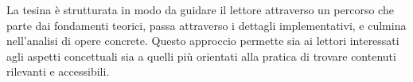 La tesina è strutturata in modo da guidare il lettore attraverso un percorso che parte dai fondamenti teorici, passa attraverso i dettagli implementativi, e culmina nell'analisi di opere concrete. Questo approccio permette sia ai lettori interessati agli aspetti concettuali sia a quelli più orientati alla pratica di trovare contenuti rilevanti e accessibili.